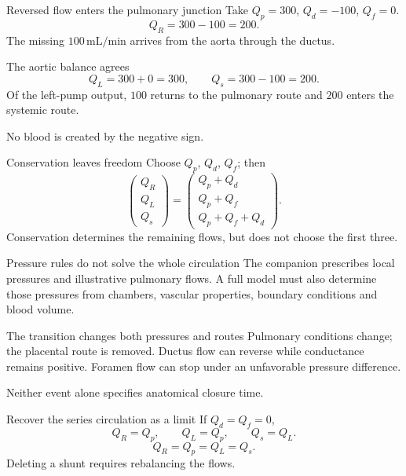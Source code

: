 \documentclass[aspectratio=169,11pt]{beamer}
\newcommand{\notestarget}{notes.pdf}\newcommand{\noteslabel}{Notes}
\begin{document}
\renewcommand{\notestarget}{notes.pdf\#note-reversal-still-obeys-conservation}
\begin{frame}[t,fragile,label=slide-reversed-flow-enters-the-pulmonary-junction]{Reversed flow enters the pulmonary junction}
Take $Q_p=300$, $Q_d=-100$, $Q_f=0$.
\[Q_R=300-100=200.\]
\pause{}
The missing $100\,\mathrm{mL/min}$ arrives from the aorta through the ductus.
\end{frame}
\renewcommand{\notestarget}{notes.pdf\#note-reversal-still-obeys-conservation}
\begin{frame}[t,fragile,label=slide-the-aortic-balance-agrees]{The aortic balance agrees}
\[Q_L=300+0=300,\qquad Q_s=300-100=200.\]
\pause{}
Of the left-pump output, $100$ returns to the pulmonary route and $200$ enters the systemic route.

No blood is created by the negative sign.
\end{frame}
\renewcommand{\notestarget}{notes.pdf\#note-reversal-still-obeys-conservation}
\begin{frame}[t,fragile,label=slide-conservation-leaves-freedom]{Conservation leaves freedom}
Choose $Q_p$, $Q_d$, $Q_f$; then
\[\begin{pmatrix}Q_R\\Q_L\\Q_s\end{pmatrix}
=\begin{pmatrix}Q_p+Q_d\\Q_p+Q_f\\Q_p+Q_f+Q_d\end{pmatrix}.\]
\pause{}
Conservation determines the remaining flows, but does not choose the first three.
\end{frame}
\renewcommand{\notestarget}{notes.pdf\#note-reversal-still-obeys-conservation}
\begin{frame}[t,fragile,label=slide-pressure-rules-do-not-solve-the-whole-circulation]{Pressure rules do not solve the whole circulation}
The companion prescribes local pressures and illustrative pulmonary flows.
\pause{}
A full model must also determine those pressures from chambers, vascular properties, boundary conditions and blood volume.
\end{frame}
\renewcommand{\notestarget}{notes.pdf\#note-changing-the-network-at-birth}
\begin{frame}[t,fragile,label=slide-the-transition-changes-both-pressures-and-routes]{The transition changes both pressures and routes}
Pulmonary conditions change; the placental route is removed.
\pause{}
Ductus flow can reverse while conductance remains positive.
Foramen flow can stop under an unfavorable pressure difference.

Neither event alone specifies anatomical closure time.
\end{frame}
\renewcommand{\notestarget}{notes.pdf\#note-changing-the-network-at-birth}
\begin{frame}[t,fragile,label=slide-recover-the-series-circulation-as-a-limit]{Recover the series circulation as a limit}
If $Q_d=Q_f=0$,
\[Q_R=Q_p,\qquad Q_L=Q_p,\qquad Q_s=Q_L.\]
\pause{}
\[\boxed{Q_R=Q_p=Q_L=Q_s}.\]
Deleting a shunt requires rebalancing the flows.
\end{frame}
\end{document}
